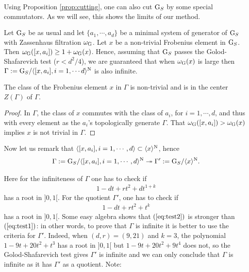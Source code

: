 \documentclass[12pt,a4paper,twoside,english]{smfart}
\def\N{{\rm N}}
\def\G{{\rm G}}
\begin{document}
Using  Proposition \ref{prop:cutting}, one can also cut $\G_S$ by some special commutators. As we will see, this shows the limits of our method.

\medskip

Let $\G_S$ be as usual and let $\{a_1,\cdots, a_d\}$ be a minimal system of generator of $\G_S$ with Zassenhaus filtration $\omega_\G$. 
Let  $x$ be a non-trivial Frobenius element in $\G_S$. Then $\omega_\G([x,a_i]) \geq 1+ \omega_\G(x)$. Hence, assuming that $\G_S$ passes the 
Golod-Shafarevich test ($r<d^2/4$), we are guaranteed that when $\omega_\G(x)$ is large then $\Gamma:=\G_S/\langle [x,a_i], i=1,\cdots d  \rangle^\N$ is also infinite. 

\begin{prop} 
The class of the Frobenius element $x$ in $\Gamma$ is non-trivial and is in the center $Z(\Gamma)$ of $\Gamma$. 
\end{prop}

\begin{proof}
In $\Gamma$, the  class of  $x$ commutes with the class of $a_i$, for $i=1,\cdots, d$,   and thus with every element 
as the $a_i$'s topologically generate  $\Gamma$. That  $\omega_\G( [x,a_i])> \omega_\G(x)$ implies
$x$ is not trivial in $\Gamma$.
\end{proof}

Now let us remark that $\langle [x,a_i], i=1,\cdots,d \rangle \subset  \langle x \rangle^\N$, hence 
$$\Gamma:=\G_S/\langle [x,a_i], i=1,\cdots,d \rangle^\N \twoheadrightarrow \Gamma':=\G_S/\langle x \rangle^\N.$$



Here for the infiniteness of $\Gamma$ one has to check if
\begin{eqnarray} \label{eq:test1} 1-dt+rt^2+dt^{1+k}
\end{eqnarray}
has a root in $]0,1[$.
For the quotient $\Gamma'$, one has to check if
\begin{eqnarray} \label{eq:test2} 1-dt+rt^2+t^{k}
\end{eqnarray}
has a root in $]0,1[$. Some easy algebra shows that 
 $(\ref{eq:test2})$ is stronger than $(\ref{eq:test1})$: in other words, to prove that $\Gamma$ is infinite it is better to use the criteria for $\Gamma'$. 
Indeed, when $(d,r)=(9,21)$ and $k=3$,  the polynomial $1-9t+20t^2+t^3$ has a root in $]0,1[$ but $1-9t+20t^2+9t^4$ does not, so
 the Golod-Shafarevich test gives $\Gamma'$ is infinite and we can only conclude that $\Gamma$ is infinite as it has $\Gamma'$ as a quotient.
Note:
\end{document}
